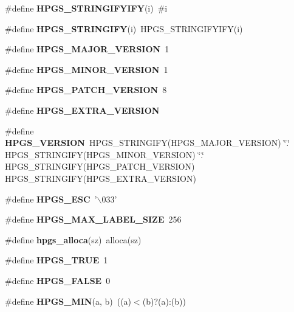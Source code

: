 \begin{DoxyCompactItemize}
\item 
\#define {\bfseries HPGS\_\-STRINGIFYIFY}(i)~\#i\label{hpgs_8h_a6ad6efbf1f5d6adef86e6983ee798753}

\item 
\#define {\bfseries HPGS\_\-STRINGIFY}(i)~HPGS\_\-STRINGIFYIFY(i)\label{hpgs_8h_a4e456ba5245914a7c5e352e2597ce632}

\item 
\#define {\bfseries HPGS\_\-MAJOR\_\-VERSION}~1\label{hpgs_8h_ade7aab82ab56928ed6df6bdcedae807c}

\item 
\#define {\bfseries HPGS\_\-MINOR\_\-VERSION}~1\label{hpgs_8h_a550e3ba4c84b649b13558c4f36d86c7f}

\item 
\#define {\bfseries HPGS\_\-PATCH\_\-VERSION}~8\label{hpgs_8h_a668869e5cf929e18ca4d9c652547ac92}

\item 
\#define {\bfseries HPGS\_\-EXTRA\_\-VERSION}\label{hpgs_8h_a88170bea2b579797be141ac2053cbb5b}

\item 
\#define {\bfseries HPGS\_\-VERSION}~HPGS\_\-STRINGIFY(HPGS\_\-MAJOR\_\-VERSION) \char`\"{}.\char`\"{} HPGS\_\-STRINGIFY(HPGS\_\-MINOR\_\-VERSION) \char`\"{}.\char`\"{} HPGS\_\-STRINGIFY(HPGS\_\-PATCH\_\-VERSION) HPGS\_\-STRINGIFY(HPGS\_\-EXTRA\_\-VERSION)\label{hpgs_8h_a42f05b0655bb58990f90051848d2014f}

\item 
\#define {\bfseries HPGS\_\-ESC}~'$\backslash$033'\label{hpgs_8h_af85c7694ffa01049f33b03cefde8471f}

\item 
\#define {\bfseries HPGS\_\-MAX\_\-LABEL\_\-SIZE}~256\label{hpgs_8h_a97fdfd742336d9c8d3087479ce300ecc}

\item 
\#define {\bfseries hpgs\_\-alloca}(sz)~alloca(sz)\label{hpgs_8h_a2cb07930a25ffa3bcd5254fa25d1ba3e}

\item 
\#define {\bfseries HPGS\_\-TRUE}~1\label{group__base_gae0f1d05c80ae8bfc1042404f598edc5a}

\item 
\#define {\bfseries HPGS\_\-FALSE}~0\label{group__base_ga7550d077e74634032f51951a9c8efd76}

\item 
\#define {\bfseries HPGS\_\-MIN}(a, b)~((a)$<$(b)?(a):(b))\label{group__base_ga7286dad34df84df5fd05ce3d26920acb}


\end{DoxyCompactItemize}
